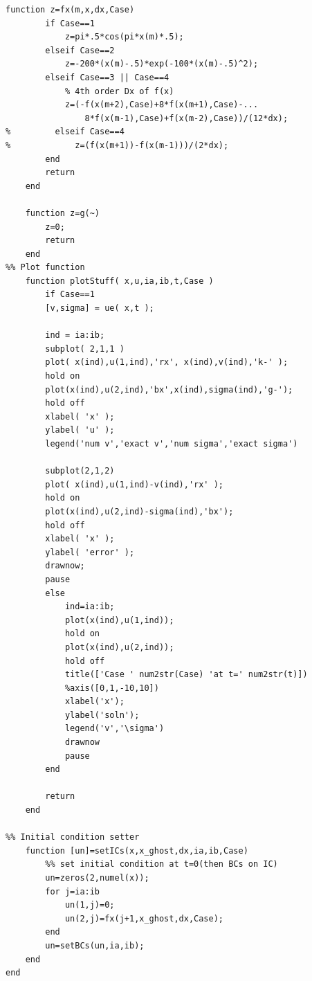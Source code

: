 \begin{lstlisting}[frame=single]
    function z=fx(m,x,dx,Case)
        if Case==1
            z=pi*.5*cos(pi*x(m)*.5);
        elseif Case==2
            z=-200*(x(m)-.5)*exp(-100*(x(m)-.5)^2);
        elseif Case==3 || Case==4
            % 4th order Dx of f(x)
            z=(-f(x(m+2),Case)+8*f(x(m+1),Case)-...
                8*f(x(m-1),Case)+f(x(m-2),Case))/(12*dx);
%         elseif Case==4
%             z=(f(x(m+1))-f(x(m-1)))/(2*dx);
        end
        return
    end

    function z=g(~)
        z=0;
        return
    end
%% Plot function
    function plotStuff( x,u,ia,ib,t,Case )
        if Case==1
        [v,sigma] = ue( x,t );
        
        ind = ia:ib;
        subplot( 2,1,1 )
        plot( x(ind),u(1,ind),'rx', x(ind),v(ind),'k-' );
        hold on
        plot(x(ind),u(2,ind),'bx',x(ind),sigma(ind),'g-');
        hold off
        xlabel( 'x' );
        ylabel( 'u' );
        legend('num v','exact v','num sigma','exact sigma')
        
        subplot(2,1,2)
        plot( x(ind),u(1,ind)-v(ind),'rx' );
        hold on
        plot(x(ind),u(2,ind)-sigma(ind),'bx');
        hold off
        xlabel( 'x' );
        ylabel( 'error' );
        drawnow;
        pause
        else
            ind=ia:ib;
            plot(x(ind),u(1,ind));
            hold on
            plot(x(ind),u(2,ind));
            hold off
            title(['Case ' num2str(Case) 'at t=' num2str(t)])
            %axis([0,1,-10,10])
            xlabel('x');
            ylabel('soln');
            legend('v','\sigma')
            drawnow
            pause
        end
        
        return
    end

%% Initial condition setter
    function [un]=setICs(x,x_ghost,dx,ia,ib,Case)
        %% set initial condition at t=0(then BCs on IC)
        un=zeros(2,numel(x));
        for j=ia:ib
            un(1,j)=0;
            un(2,j)=fx(j+1,x_ghost,dx,Case);
        end
        un=setBCs(un,ia,ib);
    end
end
\end{lstlisting}

